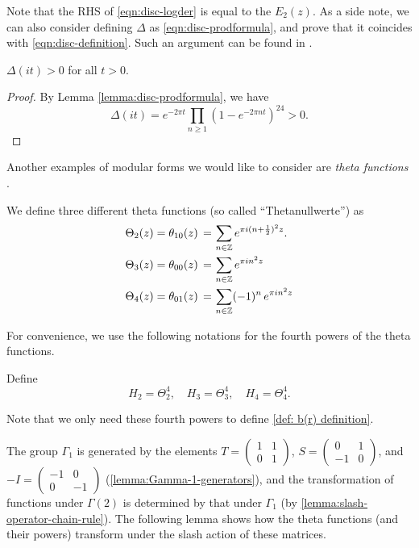 Note that the RHS of \eqref{eqn:disc-logder} is equal to the $E_2(z)$.
As a side note, we can also consider defining $\Delta$ as \eqref{eqn:disc-prodformula}, and prove that it coincides with \eqref{eqn:disc-definition}.
Such an argument can be found in \cite[Section 2.4]{Bruinier}.

\begin{corollary}\label{cor:disc-pos}
$\Delta(it) > 0$ for all $t > 0$.
\end{corollary}
\begin{proof}
By Lemma \ref{lemma:disc-prodformula}, we have
$$
\Delta(it) = e^{-2 \pi t} \prod_{n \ge 1} (1 - e^{-2 \pi n t})^{24} > 0.
$$
\end{proof}

Another examples of modular forms we would like to consider are \emph{theta functions} \cite[Section~3.1]{1-2-3}.
\begin{definition}\label{def:th00-th01-th10}
We define three different theta functions (so called ``Thetanullwerte'') as
\begin{align}
  \Theta_{2}(z) = \theta_{10}(z)\,=\, & \sum_{n\in\mathbb{Z}}e^{\pi i (n+\frac12)^2 z}. \notag \\
  \Theta_{3}(z) = \theta_{00}(z)\,=\, & \sum_{n\in\mathbb{Z}}e^{\pi i n^2 z} \notag \\
  \Theta_{4}(z) = \theta_{01}(z)\,=\, & \sum_{n\in\mathbb{Z}}(-1)^n\,e^{\pi i n^2 z} \notag \\
\end{align}
\end{definition}

For convenience, we use the following notations for the fourth powers of the theta functions.
\begin{definition}\label{def:H2-H3-H4}
Define
\begin{equation}
    H_2 = \Theta_2^4, \quad H_3 = \Theta_3^4, \quad H_4 = \Theta_4^4. \label{eqn:H2-H3-H4}
\end{equation}
\end{definition}
Note that we only need these fourth powers to define \eqref{def: b(r) definition}.

The group $\Gamma_1$ is generated by the elements $T=\left(\begin{smallmatrix}1&1\\0&1\end{smallmatrix}\right)$, $S=\left(\begin{smallmatrix}0&1\\-1&0\end{smallmatrix}\right)$, and $-I = \left(\begin{smallmatrix}-1&0\\0&-1\end{smallmatrix}\right)$ (\cref{lemma:Gamma-1-generators}), and the transformation of functions under $\Gamma(2)$ is determined by that under $\Gamma_1$ (by \cref{lemma:slash-operator-chain-rule}). The following lemma shows how the theta functions (and their powers) transform under the slash action of these matrices.

